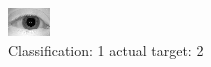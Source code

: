 \begin{figure}[h!]
\begin{center}
\includegraphics[width=0.60\columnwidth]{figures/ID945_class_1_target_2.png}
\end{center}
\caption{ Classification: 1 actual target: 2}
\label{fig:ID945_class_1_target_2}
\end{figure}
